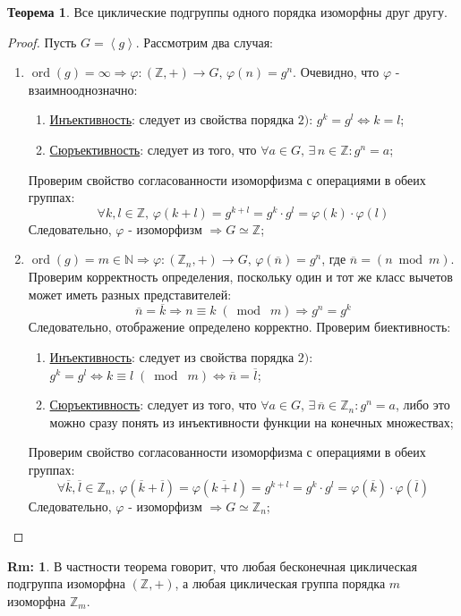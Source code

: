 \documentclass[12pt]{article}
\newcommand{\MN}{\mathbb{N}}
\newcommand{\MZ}{\mathbb{Z}}
\theoremstyle{definition}
\newtheorem{rem}{Rm:}
\newtheorem{theorem}{Теорема}
\newcommand{\linsp}[1]{\left\langle #1 \right\rangle }
\newcommand{\ovl}[1]{\overline{#1}}
\DeclareMathOperator\ord{ord}
\newcommand{\modn}[3]{#1 \equiv #2 \; (\bmod \; #3)}
\begin{document}
\begin{theorem}
	Все циклические подгруппы одного порядка изоморфны друг другу.
\end{theorem}
\begin{proof}
	Пусть $G = \linsp{g}$. Рассмотрим два случая:
	\begin{enumerate}[label=\arabic*)]
		\item $\ord(g) = \infty \Rightarrow \varphi \colon (\MZ,+) \to G, \, \varphi(n) = g^n$. Очевидно, что $\varphi$ - взаимнооднозначно: 
		\begin{enumerate}[label=(\arabic*)]
			\item \uline{Инъективность}: следует из свойства порядка $2)$: $g^k = g^l \Leftrightarrow k = l$;
			\item \uline{Сюръективность}: следует из того, что $\forall a \in G, \, \exists  \, n \in \MZ \colon g^n = a$;
		\end{enumerate}
		Проверим свойство согласованности изоморфизма с операциями в обеих группах:
		$$
			\forall k,l \in \MZ,\, \varphi(k + l) = g^{k+l} = g^{k}{\cdot}g^l = \varphi(k){\cdot}\varphi(l)
		$$
		Следовательно, $\varphi$ - изоморфизм $\Rightarrow G \simeq \MZ$;
		\item $\ord(g)  = m \in \MN \Rightarrow \varphi \colon (\MZ_n, +) \to G, \, \varphi(\ovl{n}) = g^n$, где $\ovl{n} = (n \bmod m)$. Проверим корректность определения, поскольку один и тот же класс вычетов может иметь разных представителей:
		$$
			\ovl{n} = \ovl{k} \Rightarrow \modn{n}{k}{m} \Rightarrow g^n = g^k
		$$
		Следовательно, отображение определено корректно. Проверим биективность:
		\begin{enumerate}[label=(\arabic*)]
			\item \uline{Инъективность}: следует из свойства порядка $2)$: $g^k = g^l \Leftrightarrow \modn{k}{l}{m} \Leftrightarrow \ovl{n}= \ovl{l}$;
			\item \uline{Сюръективность}: следует из того, что $\forall a \in G, \, \exists  \, \ovl{n} \in \MZ_n \colon g^n = a$, либо это можно сразу понять из инъективности функции на конечных множествах;
		\end{enumerate}
		Проверим свойство согласованности изоморфизма с операциями в обеих группах:
		$$
			\forall \ovl{k},\ovl{l} \in \MZ_n,\, \varphi(\ovl{k} + \ovl{l}) = \varphi(\ovl{k + l}) = g^{k+l} = g^{k}{\cdot}g^l = \varphi(\ovl{k}){\cdot}\varphi(\ovl{l})
		$$
		Следовательно, $\varphi$ - изоморфизм $\Rightarrow G \simeq \MZ_n$;
	\end{enumerate}
\end{proof}
\begin{rem}
	В частности теорема говорит, что любая бесконечная циклическая подгруппа изоморфна $(\MZ,+)$, а любая циклическая группа порядка $m$ изоморфна $\MZ_m$.
\end{rem}
\end{document}
